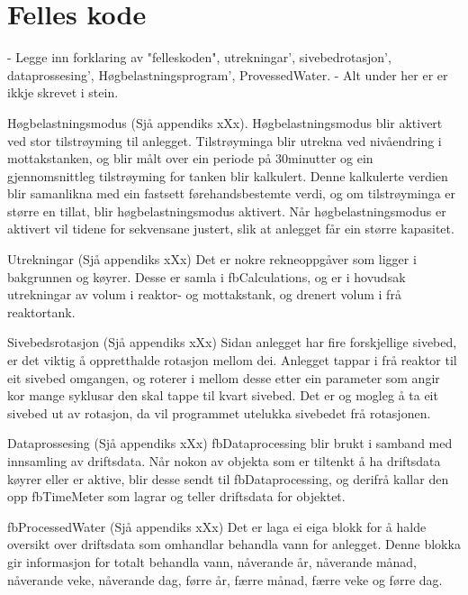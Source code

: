 \section{Felles kode}
\thispagestyle{fancy}


- Legge inn forklaring av "felleskoden", utrekningar', sivebedrotasjon', dataprossesing', Høgbelastningsprogram', ProvessedWater.
- Alt under her er er ikkje skrevet i stein.

Høgbelastningsmodus (Sjå appendiks xXx).
Høgbelastningsmodus blir aktivert ved stor tilstrøyming til anlegget. 
Tilstrøyminga blir utrekna ved nivåendring i mottakstanken, og blir målt over ein periode på 30minutter og ein gjennomsnittleg tilstrøyming for tanken blir kalkulert. Denne kalkulerte verdien blir samanlikna med ein fastsett førehandsbestemte verdi, og om tilstrøyminga er større en tillat, blir høgbelastningsmodus aktivert. 
Når høgbelastningsmodus er aktivert vil tidene for sekvensane justert, slik at anlegget får ein større kapasitet.

Utrekningar (Sjå appendiks xXx)
Det er nokre rekneoppgåver som ligger i bakgrunnen og køyrer. 
Desse er samla i fbCalculations, og er i hovudsak utrekningar av volum i reaktor- og mottakstank, og drenert volum i frå reaktortank. 

Sivebedsrotasjon (Sjå appendiks xXx)
Sidan anlegget har fire forskjellige sivebed, er det viktig å oppretthalde rotasjon mellom dei. Anlegget tappar i frå reaktor til eit sivebed omgangen, og roterer i mellom desse etter ein parameter som angir kor mange syklusar den skal tappe til kvart sivebed. 
Det er og mogleg å ta eit sivebed ut av rotasjon, da vil programmet utelukka sivebedet frå rotasjonen.

Dataprossesing (Sjå appendiks xXx)
fbDataprocessing blir brukt i samband med innsamling av driftsdata. 
Når nokon av objekta som er tiltenkt å ha driftsdata køyrer eller er aktive, blir desse sendt til fbDataprocessing, og derifrå kallar den opp fbTimeMeter som lagrar og teller driftsdata for objektet.

fbProcessedWater (Sjå appendiks xXx)
Det er laga ei eiga blokk for å halde oversikt over driftsdata som omhandlar behandla vann for anlegget. 
Denne blokka gir informasjon for totalt behandla vann, nåverande år, nåverande månad, nåverande veke, nåverande dag, førre år, færre månad, færre veke og førre dag.